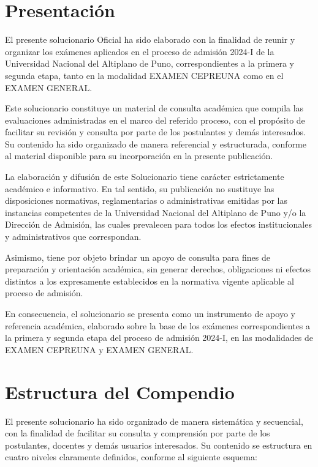 \chapter*{Presentación}

El presente solucionario Oficial ha sido elaborado con la finalidad de reunir y
organizar los exámenes aplicados en el proceso de admisión 2024-I de la
Universidad Nacional del Altiplano de Puno, correspondientes a la primera y
segunda etapa, tanto en la modalidad EXAMEN CEPREUNA como en el EXAMEN GENERAL.

Este solucionario constituye un material de consulta académica que compila las
evaluaciones administradas en el marco del referido proceso, con el propósito de
facilitar su revisión y consulta por parte de los postulantes y demás
interesados. Su
contenido ha sido organizado de manera referencial y estructurada, conforme al
material disponible para su incorporación en la presente publicación.

La elaboración y difusión de este Solucionario tiene carácter estrictamente
académico e informativo. En tal sentido, su publicación no sustituye las
disposiciones normativas, reglamentarias o administrativas emitidas por las
instancias competentes de la Universidad Nacional del Altiplano de Puno y/o la
Dirección de Admisión, las cuales prevalecen para todos los efectos
institucionales y administrativos que correspondan.

Asimismo, tiene por objeto brindar un apoyo de consulta
para fines de preparación y orientación académica, sin generar derechos,
obligaciones ni efectos distintos a los expresamente establecidos en la normativa
vigente aplicable al proceso de admisión.

En consecuencia, el solucionario se presenta como un instrumento de apoyo y
referencia académica, elaborado sobre la base de los exámenes correspondientes a
la primera y segunda etapa del proceso de admisión 2024-I, en las modalidades de
EXAMEN CEPREUNA y EXAMEN GENERAL.


\chapter*{Estructura del Compendio}

El presente solucionario ha sido organizado de manera sistemática y secuencial,
con la finalidad de facilitar su consulta y comprensión por parte de los
postulantes, docentes y demás usuarios interesados. Su contenido se estructura
en cuatro niveles claramente definidos, conforme al siguiente esquema:

